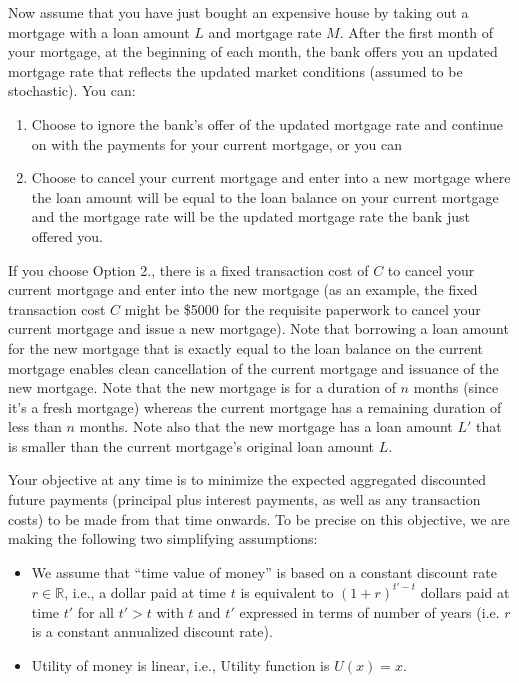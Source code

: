 \documentclass[12pt]{exam}
\begin{document}
\begin{questions}
Now assume that you have just bought an expensive house by taking out a mortgage with a loan amount $L$ and mortgage rate $M$. After the first month of your mortgage, at the beginning of each month, the bank offers you an updated mortgage rate that reflects the updated market conditions (assumed to be stochastic). You can:

\begin{enumerate}
\item Choose to ignore the bank's offer of the updated mortgage rate and continue on with the payments for your current mortgage, or you can
\item Choose to cancel your current mortgage and enter into a new mortgage where the loan amount will be equal to the loan balance on your current mortgage and the mortgage rate will be the updated mortgage rate the bank just offered you.
\end{enumerate}

If you choose Option 2., there is a fixed transaction cost of $C$ to cancel your current mortgage and enter into the new mortgage (as an example, the fixed transaction cost $C$ might be \$5000 for the requisite paperwork to cancel your current mortgage and issue a new mortgage). Note that borrowing a loan amount for the new mortgage that is exactly equal to the loan balance on the current mortgage enables clean cancellation of the current mortgage and issuance of the new mortgage. Note that the new mortgage is for a duration of $n$ months (since it's a fresh mortgage) whereas the current mortgage has a remaining duration of less than $n$ months. Note also that the new mortgage has a loan amount $L'$ that is smaller than the current mortgage's original loan amount $L$.

Your objective at any time is to minimize the expected aggregated discounted future payments (principal plus interest payments, as well as any transaction costs) to be made from that time onwards. To be precise on this objective, we are making the following two simplifying assumptions:

\begin{itemize}
    \item We assume that ``time value of money'' is based on a constant discount rate $r \in \mathbb{R}$, i.e., a dollar paid at time $t$ is equivalent to $(1 + r)^{t' - t}$ dollars paid at time $t'$ for all $t' > t$ with $t$ and $t'$ expressed in terms of number of years (i.e. $r$ is a constant annualized discount rate).
    \item Utility of money is linear, i.e., Utility function is $U(x) = x$.
\end{itemize}


\end{questions}
\end{document}
